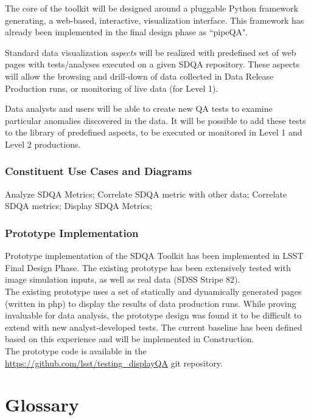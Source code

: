 \documentclass[12pt]{article}
\begin{document}
The core of the toolkit will be designed around a pluggable Python framework generating, a web-based, interactive, visualization interface. This framework has already been implemented in the final design phase as ``pipeQA".

Standard data visualization {\em aspects} will be realized with predefined set of web pages with tests/analyses executed on a given SDQA repository. These aspects will allow the browsing and drill-down of data collected in Data Release Production runs, or monitoring of live data (for Level 1).

Data analysts and users will be able to create new QA tests to examine particular anomalies discovered in the data. It will be possible to add these tests to the library of predefined aspects, to be executed or monitored in Level 1 and Level 2 productions.

\subsubsection{Constituent Use Cases and Diagrams}

Analyze SDQA Metrics; Correlate SDQA metric with other data; Correlate SDQA metrics; Display SDQA Metrics;

\subsubsection{Prototype Implementation}

Prototype implementation of the SDQA Toolkit has been implemented in LSST Final Design Phase. The existing prototype has been extensively tested with image simulation inputs, as well as real data (SDSS Stripe 82).
\\

The existing prototype uses a set of statically and dynamically generated pages (written in php) to display the results of data production runs. While proving invaluable for data analysis, the prototype design was found it to be difficult to extend with new analyst-developed tests. The current baseline has been defined based on this experience and will be implemented in Construction.
\\

The prototype code is available in the \url{https://github.com/lsst/testing_displayQA} git repository.

\clearpage

\section{Glossary}
\end{document}
